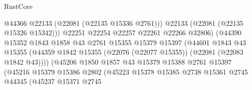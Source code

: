 \begin{lexlean}{RustCore}
\begin{coremodule}
                                            @44366
                                            @22133
                                            (@22081 (@22135 @15336 @2761)))
                                          @22133
                                          (@22081 (@22135 @15326 @15342)))
                                        @22251
                                        @22254
                                        @22257
                                        @22261
                                        @22266
                                        @32806)
                                      (@44390
                                        @15352
                                        @1843
                                        @1858
                                        @43
                                        @2761
                                        @15355
                                        @15379
                                        @15397
                                        (@44601
                                          @1843
                                          @43
                                          @15355
                                          (@44359
                                            @1842
                                            @15355
                                            (@22076 (@22077 @15355))
                                            (@22081 (@22083 @1842 @43))))
                                        (@45206
                                          @1850
                                          @1857
                                          @43
                                          @15379
                                          @15388
                                          @2761
                                          @15397
                                          (@45216
                                            @15379
                                            @15386
                                            @2802
                                            (@45223
                                              @15378
                                              @15385
                                              @2738
                                              @15361
                                              @2745
                                              @44345
                                              (@45237
                                                @15371
                                                @2745

\end{coremodule}
\end{lexlean}
